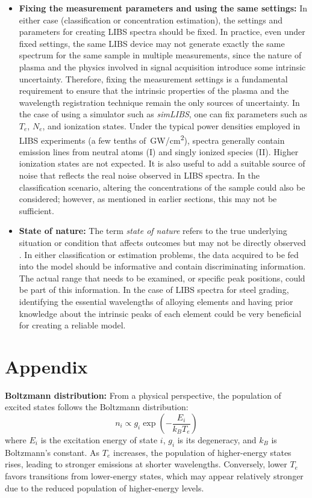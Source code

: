 \documentclass[12pt,a4paper]{article}
\begin{document}
\begin{itemize}
	 	\item \textbf{Fixing the measurement parameters and using the same settings:} In either case (classification or concentration estimation), the settings and parameters for creating LIBS spectra should be fixed. In practice, even under fixed settings, the same LIBS device may not generate exactly the same spectrum for the same sample in multiple measurements, since the nature of plasma and the physics involved in signal acquisition introduce some intrinsic uncertainty. Therefore, fixing the measurement settings is a fundamental requirement to ensure that the intrinsic properties of the plasma and the wavelength registration technique remain the only sources of uncertainty. In the case of using a simulator such as \textit{simLIBS}, one can fix parameters such as $T_e$, $N_e$, and ionization states. Under the typical power densities employed in LIBS experiments (a few tenths of~GW/cm\textsuperscript{2}), spectra generally contain emission lines from neutral atoms (I) and singly ionized species (II). Higher ionization states are not expected. It is also useful to add a suitable source of noise that reflects the real noise observed in LIBS spectra. In the classification scenario, altering the concentrations of the sample could also be considered; however, as mentioned in earlier sections, this may not be sufficient. 
	 	
	 	\item \textbf{State of nature:} The term \textit{state of nature} refers to the true underlying situation or condition that affects outcomes but may not be directly observed \cite{Duda2001PatternClassification}. In either classification or estimation problems, the data acquired to be fed into the model should be informative and contain discriminating information. The actual range that needs to be examined, or specific peak positions, could be part of this information. In the case of LIBS spectra for steel grading, identifying the essential wavelengths of alloying elements and having prior knowledge about the intrinsic peaks of each element could be very beneficial for creating a reliable model.
	 \end{itemize}
	 
	
	
	
	\section*{Appendix}
	\textbf{Boltzmann distribution:}
	From a physical perspective, the population of excited states follows the Boltzmann distribution:
	\[
	n_i \propto g_i \exp\left(-\frac{E_i}{k_B T_e}\right)
	\]
	where $E_i$ is the excitation energy of state $i$, $g_i$ is its degeneracy, and $k_B$ is Boltzmann’s constant. As $T_e$ increases, the population of higher-energy states rises, leading to stronger emissions at shorter wavelengths. Conversely, lower $T_e$ favors transitions from lower-energy states, which may appear relatively stronger due to the reduced population of higher-energy levels.
	
\end{document}
